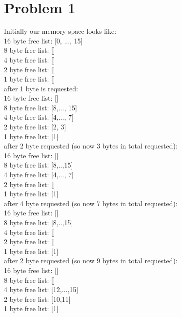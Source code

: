 \documentclass{article}
\title{\thetitle}
\author{\theauthor}
\begin{document}
\maketitle
\section*{Problem 1}
Initially our memory space looks like:\\
16 byte free list: [0, ..., 15] \\
8 byte free list: [] \\
4 byte free list: [] \\
2 byte free list: [] \\
1 byte free list: [] \\
after 1 byte is requested: \\
16 byte free list: [] \\
8 byte free list: [8,..., 15] \\
4 byte free list: [4,..., 7] \\
2 byte free list: [2, 3] \\
1 byte free list: [1] \\
after 2 byte requested (so now 3 bytes in total requested):\\
16 byte free list: [] \\
8 byte free list: [8,..,15] \\
4 byte free list: [4,..., 7] \\
2 byte free list: [] \\
1 byte free list: [1] \\
after 4 byte requested (so now 7 bytes in total requested):\\
16 byte free list: [] \\
8 byte free list: [8,..,15] \\
4 byte free list: [] \\
2 byte free list: [] \\
1 byte free list: [1] \\
after 2 byte requested (so now 9 bytes in total requested):\\
16 byte free list: [] \\
8 byte free list: [] \\
4 byte free list: [12,...,15] \\
2 byte free list: [10,11] \\
1 byte free list: [1] \\
\end{document}
